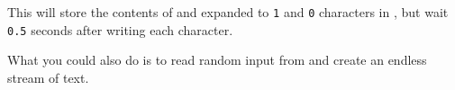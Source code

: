 This will store the contents of  and
 expanded to \verb|1| and \verb|0| characters in
, but wait \verb|0.5| seconds after writing
each character.

What you could also do is to read random input from 
and create an endless stream of text.



\osueguidelinesone


